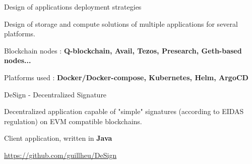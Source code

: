 \begin{cventries}
  \cventry
      {} %
      {Design of applications deployment strategies} %
      {} %
      {} %
      {
        \begin{cvitems} %
          \item {Design of storage and compute solutions of multiple applications for several platforms.}
          \item {Blockchain nodes : \textbf{Q-blockchain, Avail, Tezos, Presearch, Geth-based nodes...}}
          \item {Platforms used : \textbf{Docker/Docker-compose, Kubernetes, Helm, ArgoCD}\\}
        \end{cvitems}
      }
  \cventry
    {} %
    {DeSign - Decentralized Signature} %
    {} %
    {} %
    {
      \begin{cvitems} %
        \item {Decentralized application capable of "simple" signatures (according to EIDAS regulation) on EVM compatible blockchains.}
        \item {Client application, written in \textbf{Java}}
        \item {\href{https://github.com/guillheu/DeSign}{https://github.com/guillheu/DeSign}\\}
      \end{cvitems}
    }
 

\end{cventries}
